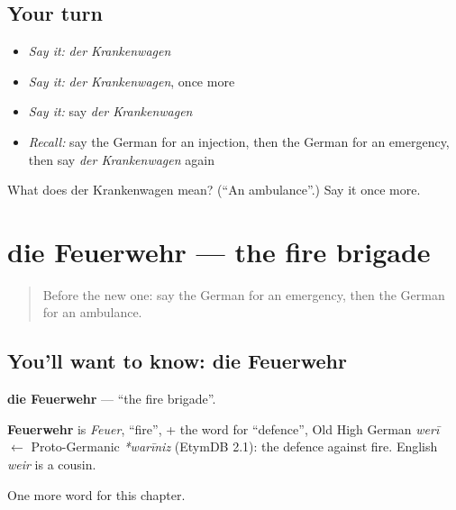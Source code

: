 \subsection*{Your turn}
\begin{itemize}
\raggedright
  \item \emph{Say it:} \emph{der Krankenwagen}
  \item \emph{Say it:} \emph{der Krankenwagen}, once more
  \item \emph{Say it:} say \emph{der Krankenwagen}
  \item \emph{Recall:} say the German for an injection, then the German for an emergency, then say \emph{der Krankenwagen} again
\end{itemize}

\begin{tcolorbox}[breakable,colback=teal!4,colframe=teal!35!black,title={Before you move on}]
What does der Krankenwagen mean? (\textquotedblleft{}An ambulance\textquotedblright{}.) Say it once more.
\end{tcolorbox}
\section[die Feuerwehr]{die Feuerwehr — the fire brigade}

\label{lesson:GE-C207-feuerwehr}



\begin{quote}
Before the new one: say the German for an emergency, then the German for an ambulance.
\end{quote}

\subsection*{You'll want to know: die Feuerwehr}
\textbf{die Feuerwehr} — \textquotedblleft{}the fire brigade\textquotedblright{}.

\begin{cousinweb}
\textbf{Feuerwehr} is \emph{Feuer}, \textquotedblleft{}fire\textquotedblright{}, + the word for \textquotedblleft{}defence\textquotedblright{}, Old High German \emph{werī} $\leftarrow$ Proto-Germanic \emph{*warīniz} (EtymDB 2.1): the defence against fire. English \emph{weir} is a cousin.
\end{cousinweb}

\begin{grammarlens}[title={What you've built}]
One more word for this chapter.
\end{grammarlens}


